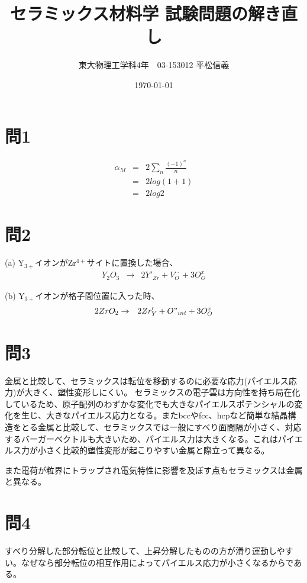 \documentclass[11pt,a4paper]{jsarticle}
\title{セラミックス材料学 試験問題の解き直し}
\author{東大物理工学科4年　03-153012 平松信義}
\date{\today}
\begin{document}
\maketitle

\section*{問1}
\begin{eqnarray}
\alpha_M &=& 2 \sum_{n}  \frac{(-1)^n}{n}\nonumber\\ 
&=& 2 log(1+1)\nonumber\\
&=& 2log2
\end{eqnarray}

\section*{問2}
(a) Y$_{3+}$イオンがZr$^{4+}$サイトに置換した場合、
\begin{eqnarray}
Y_2O_3 &\to& 2Y'_{Zr} +V_O^{\cdot\cdot} +3O_O^x
\end{eqnarray}

(b) Y$_{3+}$イオンが格子間位置に入った時、
\begin{eqnarray}
2ZrO_2 &\to& 2Zr'_{Y} +O"_{int} +3O_O^x
\end{eqnarray}

\section*{問3}
金属と比較して、セラミックスは転位を移動するのに必要な応力(パイエルス応力)が大きく、塑性変形しにくい。
セラミックスの電子雲は方向性を持ち局在化しているため、原子配列のわずかな変化でも大きなパイエルスポテンシャルの変化を生じ、大きなパイエルス応力となる。またbccやfcc、hcpなど簡単な結晶構造をとる金属と比較して、セラミックスでは一般にすべり面間隔が小さく、対応するバーガーベクトルも大きいため、パイエルス力は大きくなる。これはパイエルス力が小さく比較的塑性変形が起こりやすい金属と際立って異なる。

また電荷が粒界にトラップされ電気特性に影響を及ぼす点もセラミックスは金属と異なる。


\section*{問4}
すべり分解した部分転位と比較して、上昇分解したものの方が滑り運動しやすい。なぜなら部分転位の相互作用によってパイエルス応力が小さくなるからである。
\end{document}
